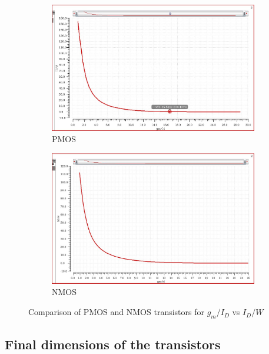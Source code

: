 \begin{figure}[ht!]
\begin{subfigure}[c]{0.80\linewidth}
\includegraphics[width = \textwidth]{images/Id_w_vs_gm_id_pmos.jpg}
\caption{PMOS}
\label{fig:gm_pmos}
\end{subfigure}

\begin{subfigure}[c]{0.80\linewidth}
\includegraphics[width = \textwidth]{images/gm_id_w_nmos.jpg}
\caption{NMOS}
\label{fig:gm_nmos}
\end{subfigure}

\caption{Comparison of PMOS and NMOS transistors for $g_m/I_D$ vs $I_D/W$}
\label{fig:comp_pmos_nmos}
\end{figure}


\subsection{Final dimensions of the transistors}

